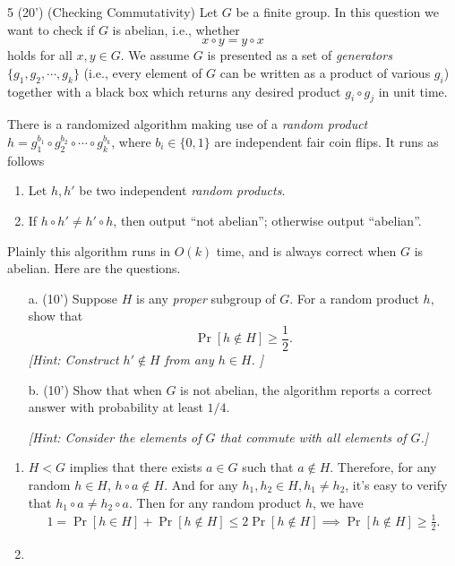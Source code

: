 
\begin{question}{5 (20') (Checking Commutativity)}
	Let $G$ be a finite group. In this question we want to check if $G$ is abelian, i.e., whether
	$$
	x\circ y=y\circ x
	$$
	holds for all $x,y\in G$. We assume $G$ is presented as a set of \textit{generators} $\{g_1,g_2,\cdots,g_k\}$ (i.e., every element of $G$ can be written as a product of various $g_i$) together with a black box which returns any desired product $g_i\circ g_j$ in unit time.
	
	There is a randomized algorithm making use of a \textit{random product} $h=g_1^{b_1}\circ g_2^{b_2}\circ\cdots\circ g_k^{b_k}$, where $b_i\in\{0,1\}$ are independent fair coin flips. It runs as follows
	\begin{enumerate}
		\item Let $h,h'$ be two independent \textit{random products}.
		\item If $h\circ h'\neq h'\circ h$, then output ``not abelian''; otherwise output ``abelian''.
	\end{enumerate}
	
	Plainly this algorithm runs in $O(k)$ time, and is always correct when $G$ is abelian. Here are the questions.
	\begin{itemize}
		\item[a. (10')] Suppose $H$ is any \textit{proper} subgroup of $G$. For a random product $h$, show that 
		$$
		\Pr[h\notin H]\geq\frac{1}{2}.
		$$
		\textit{[Hint: Construct $h'\notin H$ from any $h\in H$. ]}
		
		\item[b. (10')] Show that when $G$ is not abelian, the algorithm reports a correct answer with probability at least $1/4$. 
		
		\textit{[Hint: Consider the elements of $G$ that commute with all elements of $G$.]}
	\end{itemize}
\end{question}

\begin{answer}
	\begin{enumerate}[label=\alph*).]
		\item $H < G$ implies that there exists $a \in G$ such that $a \notin H$. Therefore, for any random $h \in H$, $h \circ a \notin H$. And for any $h_1, h_2 \in H, h_1\neq h_2$, it's easy to verify that $h_1\circ a \neq h_2\circ a$. 
		Then for any random product $h$, we have 
		\begin{align*}
			1 = \Pr[h\in H] + \Pr[h\notin H] \le 2\Pr[h\notin H] \implies \Pr[h\notin H] \ge \frac{1}{2}.
		\end{align*}
		\item 
	\end{enumerate}
\end{answer}